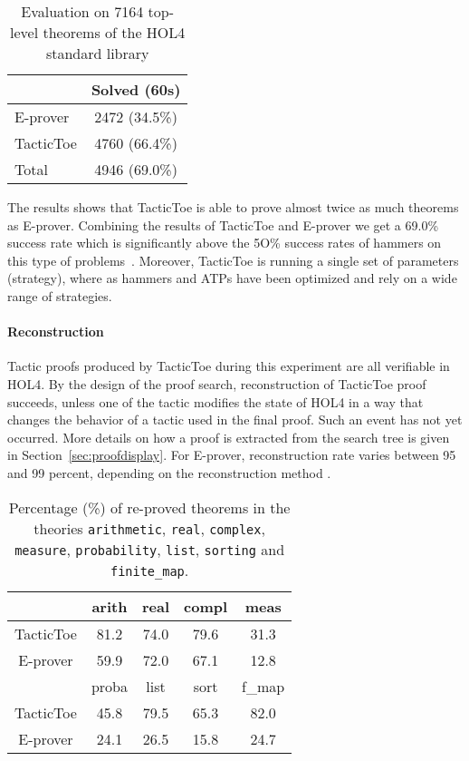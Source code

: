 \documentclass[runningheads,a4paper,draft]{svjour3}
\def\holfour{\textsf{HOL4}\xspace}
\def\eprover{\textsf{E-prover}\xspace}
\def\tactictoe{\textsf{TacticToe}\xspace}
\newcommand{\ra}[1]{\renewcommand{\arraystretch}{#1}}
\begin{document}
\begin{table}[h!]
\centering\ra{1.3}
\small
\begin{tabular}{lc}
\toprule
  & Solved (60s) \\
\midrule
   \eprover   & 2472 (34.5\%)\\
   \tactictoe & 4760 (66.4\%)\\
\midrule
   Total  & 4946 (69.0\%)\\
\bottomrule
\end{tabular}
\caption{Evaluation on 7164 top-level theorems of the \holfour standard library
\label{tab:_param}}
\end{table}

The results shows that \tactictoe is able to prove almost twice as much
theorems as \eprover. Combining the results of \tactictoe and \eprover we get a
69.0\% success rate which is significantly above the 5O\% success rates
of hammers on this type of problems~\cite{tgck-cpp15}. Moreover, \tactictoe is
running a single set of parameters (strategy), where as hammers and ATPs have
been optimized and rely on a wide range of strategies.


\paragraph{Reconstruction}
Tactic proofs produced by \tactictoe during this experiment are all verifiable
in \holfour. By the design of the proof search, reconstruction of \tactictoe
proof succeeds, unless one of the tactic modifies the state of \holfour in a
way that changes the behavior of a tactic used in the final proof. Such an
event has not yet occurred.
More details on how a proof is extracted from the search tree is given in
Section~\ref{sec:proofdisplay}.
For \eprover, reconstruction rate varies between 95 and 99 percent, depending
on the reconstruction method \cite{}.

\begin{table}[]
\centering
\setlength{\tabcolsep}{3mm}
\begin{tabular}{@{}ccccc@{}}
\toprule
\phantom{ab} & {arith} & {real} & {compl} & {meas} \\
\midrule
\tactictoe & 81.2 & 74.0 & 79.6 & 31.3\\
\eprover & 59.9 & 72.0 & 67.1 & 12.8\\
\midrule
\phantom{abc} & {proba} & {list} & {sort} & {f\_map} \\
\midrule
\tactictoe & 45.8 & 79.5 & 65.3 & 82.0 \\
\eprover & 24.1 & 26.5 & 15.8 & 24.7 \\
\bottomrule
\end{tabular}
\caption{\label{theories}Percentage (\%) of re-proved theorems in the theories
\texttt{arithmetic}, \texttt{real}, \texttt{complex}, \texttt{measure},
\texttt{probability}, \texttt{list}, \texttt{sorting} and \texttt{finite\_map}.
}
\end{table}
\end{document}
